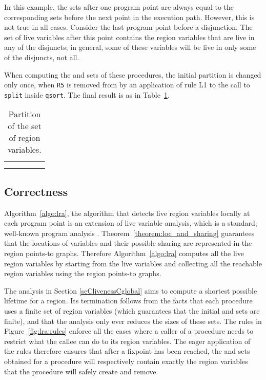 \documentclass{tlp}
\newcommand{\code}[1]{{\tt#1}}
\begin{document}
In this example, the sets after one program point are always equal
to the corresponding sets before the next point in the execution path.
However, this is not true in all cases.
Consider the last program point before a disjunction.
The set of live variables after this point contains
the region variables that are live in any of the disjuncts;
in general, some of these variables
will be live in only some of the disjuncts, not all.

When computing the  and  sets of these procedures,
the initial partition is changed only once,
when \code{R5} is removed from 
by an application of rule L1 to the call to \code{split} inside \code{qsort}.
The final result is as in Table~\ref{table:lra:across}.
\begin{table}
    \centering
    \small
    \caption{Partition of the set of region variables.}
    \begin{tabular}{l|*{4}{c|}}
        \hline
        \hline
                          &                   &                &      &      \\
        \hline
            &                    &  &  &   \\
            &    &                &  &   \\
        \hline
        \hline
    \end{tabular}
    \label{table:lra:across}
\end{table}

\subsection{Correctness}

Algorithm~\ref{algo:lra}, the algorithm that detects
live region variables locally at each program point
is an extension of live variable analysis,
which is a standard, well-known program analysis \cite{POPA}.
Theorem~\ref{theorem:loc_and_sharing} guarantees that
the locations of variables and their possible sharing
are represented in the region points-to graphs.
Therefore Algorithm~\ref{algo:lra} computes all the live region variables
by starting from the live variables
and collecting all the reachable region variables
using the region points-to graphs.

The analysis in Section \ref{seClivenessCglobal}
aims to compute a shortest possible lifetime for a region.
Its termination follows from the facts that
each procedure uses a finite set of region variables
(which guarantees that
the initial  and  sets are finite),
and that the analysis only ever reduces the sizes of these sets.
The rules in Figure~\ref{fig:lra:rules} enforce all the cases
where a caller of a procedure needs to restrict
what the callee can do to its region variables.
The eager application of the rules therefore ensures that
after a fixpoint has been reached,
the  and  sets obtained for a procedure
will respectively contain exactly the region variables
that the procedure will safely create and remove.
\end{document}
